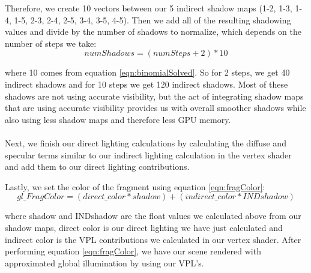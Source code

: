 Therefore, we create 10 vectors between our 5 indirect shadow maps (1-2, 1-3, 1-4, 1-5, 2-3, 2-4, 2-5, 3-4, 3-5, 4-5).  Then we add all of the resulting shadowing values and divide by the number of shadows to normalize, which depends on the number of steps we take:
\begin{equation}
numShadows = (numSteps+2)*10\label{eqn:numIndShadows}
\end{equation}

where 10 comes from equation \ref{eqn:binomialSolved}.  So for 2 steps, we get 40 indirect shadows and for 10 steps we get 120 indirect shadows.  Most of these shadows are not using accurate visibility, but the act of integrating shadow maps that are using accurate visibility provides us with overall smoother shadows while also using less shadow maps and therefore less GPU memory.

\paragraph{}
Next, we finish our direct lighting calculations by calculating the diffuse and specular terms similar to our indirect lighting calculation in the vertex shader and add them to our direct lighting contributions.

Lastly, we set the color of the fragment using equation \ref{eqn:fragColor}:
\begin{equation}
gl\_FragColor = (direct\_color*shadow) + (indirect\_color*INDshadow) \label{eqn:fragColor}
\end{equation}

where shadow and INDshadow are the float values we calculated above from our shadow maps, direct color is our direct lighting we have just calculated and indirect color is the VPL contributions we calculated in our vertex shader.  After performing equation \ref{eqn:fragColor}, we have our scene rendered with approximated global illumination by using our VPL's.
